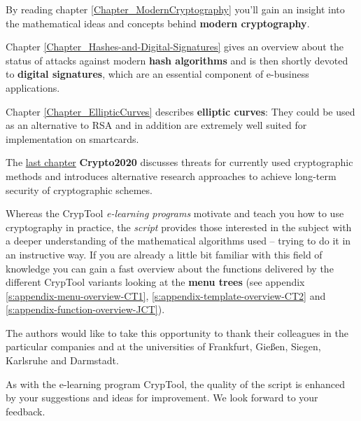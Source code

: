 By reading chapter \ref{Chapter_ModernCryptography}
you'll gain an insight into the mathematical ideas and concepts behind 
{\bf modern cryptography}.

Chapter \ref{Chapter_Hashes-and-Digital-Signatures} gives
an overview about the status of attacks against modern {\bf hash algorithms}
and is then shortly devoted to {\bf digital signatures}, 
which are an essential component of e-business applications.

Chapter \ref{Chapter_EllipticCurves} describes {\bf elliptic curves}:
They could be used as an alternative to RSA and in addition are extremely
well suited for implementation on smartcards.

The \hyperlink{Chapter_Crypto2020}{last chapter} {\bf Crypto2020}
discusses threats for currently used cryptographic methods and introduces
alternative research approaches to achieve long-term security
of cryptographic schemes.

Whereas the CrypTool \textit{e-learning programs} motivate
and teach you how to use cryptography in practice, the \textit{script} provides
those interested in the subject with a deeper understanding of the mathematical
algorithms used -- trying to do it in an instructive way.
If you are already a little bit familiar with this field of knowledge you can
gain a fast overview about the functions delivered by the different CrypTool
variants looking at the {\bf menu trees} (see appendix \ref{s:appendix-menu-overview-CT1}, \ref{s:appendix-template-overview-CT2} and \ref{s:appendix-function-overview-JCT}).

The authors would like to take this opportunity to thank their colleagues 
in the particular companies and at the universities of Frankfurt, Gie\ss en, 
Siegen, Karlsruhe and Darmstadt.

\enlargethispage{12pt}
As with the e-learning program CrypTool, the quality of the 
script is enhanced by your suggestions and ideas for improvement. 
We look forward to your feedback.


